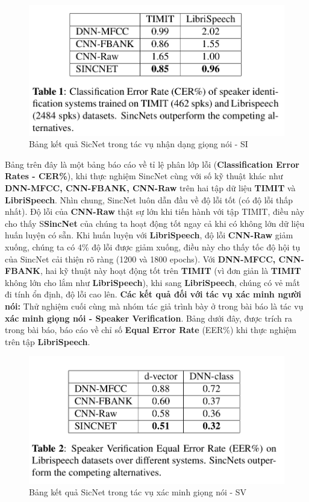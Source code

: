 \documentclass{article}
\begin{document}
	\begin{figure}[H]
		\centering
		\includegraphics[width=.75\textwidth]{images/performance_speaker_identification.png}
		\caption{Bảng kết quả SicNet trong tác vụ nhận dạng giọng nói - SI}
		\label{fig:writing-thesis}
	\end{figure}
	Bảng trên đây là một bảng báo cáo về tỉ lệ phân lớp lỗi (\textbf{Classification Error Rates - CER\%}), khi thực nghiệm SincNet cùng với số kỹ thuật khác như \textbf{DNN-MFCC, CNN-FBANK, CNN-Raw} trên hai tập dữ liệu \textbf{TIMIT} và \textbf{LibriSpeech}. Nhìn chung, SincNet luôn dẫn đầu về độ lỗi tốt (có độ lỗi thấp nhất). Độ lỗi của \textbf{CNN-Raw} thật sự lớn khi tiến hành với tập TIMIT, điều này cho thấy S\textbf{SincNet} của chúng ta hoạt động tốt ngay cả khi có không lớn dữ liệu huấn luyện có sẵn. Khi huấn luyện với \textbf{LibriSpeech}, độ lỗi \textbf{CNN-Raw} giảm xuống, chúng ta có 4\% độ lỗi được giảm xuống, điều này cho thấy tốc độ hội tụ của SincNet cải thiện rõ ràng (1200 và 1800 epochs). Với \textbf{DNN-MFCC, CNN-FBANK}, hai kỹ thuật này hoạt động tốt trên \textbf{TIMIT} (vì đơn giản là \textbf{TIMIT} không lớn cho lắm như \textbf{LibriSpeech}), khi sang \textbf{LibriSpeech}, chúng có vẻ mất đi tính ổn định, độ lỗi cao lên.
	\textbf{Các kết quả đối với tác vụ xác minh người nói: } Thử nghiệm cuối cùng mà nhóm tác giả trình bày ở trong bài báo là tác vụ \textbf{xác minh giọng nói - Speaker Verification}. Bảng dưới đây, được trích ra trong bài báo, báo cáo về chỉ số \textbf{Equal Error Rate} (EER\%) khi thực nghiệm trên tập \textbf{LibriSpeech}. 
	\begin{figure}[H]
		\centering
		\includegraphics[width=.75\textwidth]{images/performance_speaker_verification.png}
		\caption{Bảng kết quả SicNet trong tác vụ xác minh giọng nói - SV}
		\label{fig:writing-thesis}
	\end{figure}
	
\end{document}
